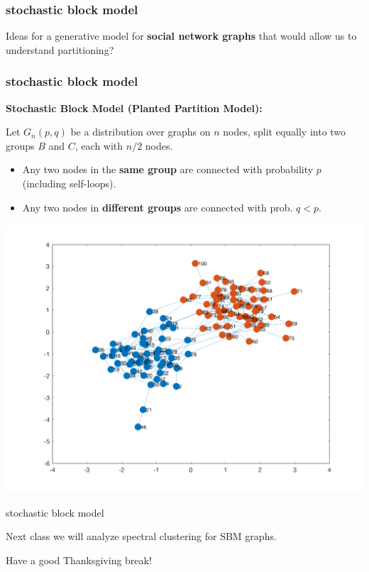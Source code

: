 \documentclass[compress]{beamer}
\newcommand{\bv}[1]{\mathbf{#1}}
\newcommand{\R}{\mathbb{R}}
\newcommand{\E}{\mathbb{E}}
\begin{document}
\begin{frame}[t]
	\frametitle{stochastic block model}
	\begin{center}
		\alert{Ideas for a generative model for \textbf{social network graphs} that would allow us to understand partitioning?}
	\end{center}
	
\end{frame}

\begin{frame}
	\frametitle{stochastic block model}
	\textbf{Stochastic Block Model (Planted Partition Model):} 
	
	Let $G_n(p,q)$ be a distribution over graphs on $n$ nodes, split equally into two groups $B$ and $C$, each with $n/2$ nodes.
	\begin{itemize}
		\item Any two nodes in the \textbf{\alert{same group}} are connected with probability $p$ (including self-loops).
		\item Any two nodes in \textbf{\alert{different groups}} are connected with prob. $q < p$.
	\end{itemize}
	\vspace{-1em}
	\begin{center}
		\includegraphics[width=.5\textwidth]{stochasticBlock.png}
	\end{center}
\end{frame}

\begin{frame}{stochastic block model}
	\begin{center}
		Next class we will analyze spectral clustering for SBM graphs.

		Have a good Thanksgiving break!
	\end{center}
\end{frame}

\end{document}
